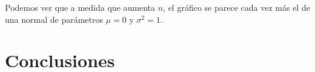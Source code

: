 \documentclass[a4paper]{article}
\begin{document}
	\begin{figure}[H]
		\centering
		\hfill
	\end{figure}
	
	Podemos ver que a medida que aumenta $n$, el gr\'afico se parece cada vez m\'as el de una normal de par\'ametros $\mu = 0$ y $\sigma^2 = 1$. 

	\newpage
	
	\section{Conclusiones}
	
	\newpage
\end{document}

